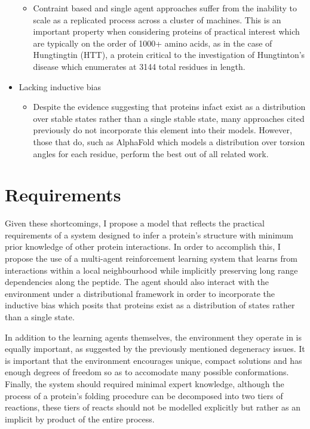 \begin{itemize}
    \begin{itemize}
        \item Contraint based and single agent approaches suffer from the inability to scale as a replicated
        process across a cluster of machines. This is an important property when considering proteins
        of practical interest which are typically on the order of 1000+ amino acids, as in the case of
        Hungtingtin (HTT), a protein critical to the investigation of Hungtinton's disease which enumerates at 
        3144 total residues in length. 
    \end{itemize}
    \item Lacking inductive bias
    \begin{itemize}
        \item Despite the evidence suggesting that proteins infact exist as a distribution
        over stable states rather than a single stable state, many approaches cited previously do
        not incorporate this element into their models. However, those that do, such as AlphaFold which 
        models a distribution over torsion angles for each residue, perform the best out of all related work.
    \end{itemize}
\end{itemize}
\section{Requirements}
Given these shortcomings, I propose a model that reflects the practical requirements of a system
designed to infer a protein's structure with minimum prior knowledge of other protein interactions.
In order to accomplish this, I propose the use of a multi-agent reinforcement learning system that learns from 
interactions within a local neighbourhood while implicitly preserving long range dependencies along the peptide. The agent should
also interact with the environment under a distributional framework in order to incorporate the inductive bias
which posits that proteins exist as a distribution of states rather than a single state.

In addition to the learning agents themselves, the environment they operate in is equally important,
as suggested by the previously mentioned degeneracy issues. It is important that the environment 
encourages unique, compact solutions and has enough degrees of freedom so as to accomodate many possible conformations.
Finally, the system should required minimal expert knowledge, although the process of a
protein's folding procedure can be decomposed into two tiers of reactions, these tiers of
reacts should not be modelled explicitly but rather as an implicit by product of the entire process.

